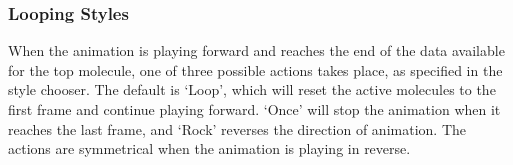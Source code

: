 \subsubsection{Looping Styles}
When the animation is playing forward and reaches the end of
the data available for the top molecule, one of three possible actions
takes place, as specified in the style chooser.  The default is
`Loop', which will reset the active molecules to the first frame and
continue playing forward.  `Once' will stop the animation when it
reaches the last frame, and `Rock' reverses the direction of
animation.  The actions are symmetrical when the animation is playing
in reverse.

